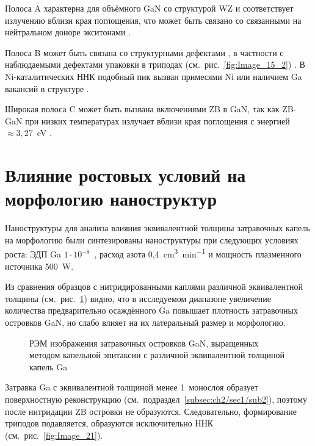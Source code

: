 Полоса A характерна для объёмного GaN со структурой WZ и соответствует
излучению вблизи края поглощения, что может быть связано со связанными на
нейтральном доноре экситонами \cite{Bolshakov2018, Richter2008, Agekyan2013}.

Полоса B может быть связана со структурными дефектами \cite{Calleja2000}, в
частности с наблюдаемыми дефектами упаковки в триподах
(см.~рис.~\cref{fig:Image_15_2}) \cite{Albrecht1997, Paskov2005}. В
Ni-каталитических ННК подобный пик вызван примесями Ni или наличием Ga вакансий
в структуре \cite{Yoo2006}.

Широкая полоса C может быть вызвана включениями ZB в GaN, так как ZB-GaN при
низких температурах излучает вблизи края поглощения с энергией \(\approx
3,27\)~\si{\electronvolt} \cite{Jacobs2007}.

\section{Влияние ростовых условий на морфологию наноструктур}\label{sec:ch3/sec5}

Наноструктуры для анализа влияния эквивалентной толщины затравочных капель на
морфологию были синтезированы наноструктуры при следующих условиях роста: ЭДП
Ga \(1 \cdot 10^{-8}\)~\si{\torr}, расход азота
0,4~\si{\centi\meter^3\per\minute} и мощность плазменного источника
500~\si{\watt}.

Из сравнения образцов с нитридированными каплями различной эквивалентной
толщины (см.~рис.~\cref{fig:Image_20}) видно, что в исследуемом диапазоне
увеличение количества предварительно осаждённого Ga повышает плотность
затравочных островков GaN, но слабо влияет на их латеральный размер и
морфологию.

\begin{figure}[ht] 
			\caption{РЭМ изображения затравочных островков GaN, выращенных методом
				капельной эпитаксии с различной эквивалентной толщиной капель
		Ga}\label{fig:Image_20} \end{figure}

Затравка Ga с эквивалентной толщиной менее 1~монослоя образует поверхностную
реконструкцию (см.~подраздел~\cref{subsec:ch2/sec1/sub2}), поэтому после
нитридации ZB островки не образуются. Следовательно, формирование триподов
подавляется, образуются исключительно ННК (см.~рис.~\cref{fig:Image_21}).

